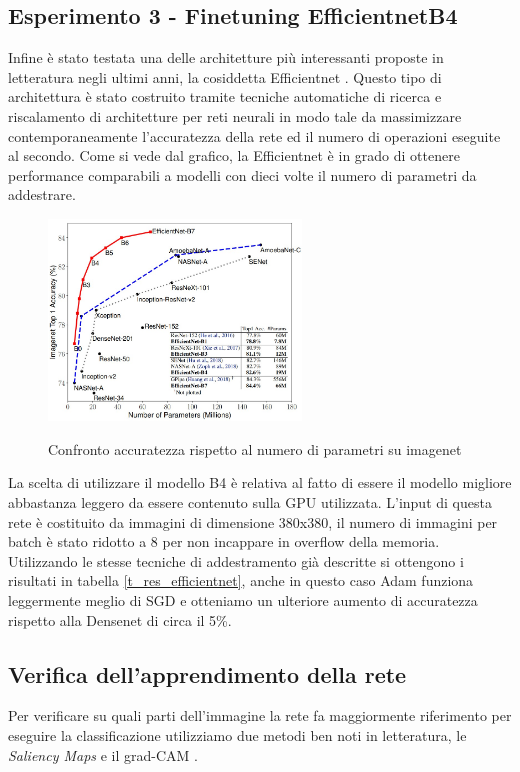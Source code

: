 \subsection{Esperimento 3 - Finetuning EfficientnetB4}
Infine è stato testata una delle architetture più interessanti proposte in letteratura negli ultimi anni, la cosiddetta Efficientnet \cite{tan2019efficientnet}.
Questo tipo di architettura è stato costruito tramite tecniche automatiche di ricerca e riscalamento di architetture per reti neurali in modo tale da massimizzare contemporaneamente l'accuratezza della rete ed il numero di operazioni eseguite al secondo.
Come si vede dal grafico, la Efficientnet è in grado di ottenere performance comparabili a modelli con dieci volte il numero di parametri da addestrare.
\begin{figure}[H]

\centering
\includegraphics[width=0.6\textwidth]{images/efficientnet} 
\label{fig_efficientnet}
\caption{Confronto accuratezza rispetto al numero di parametri su imagenet}
\end{figure} 
La scelta di utilizzare il modello B4 è relativa al fatto di essere il modello migliore abbastanza leggero da essere contenuto sulla GPU utilizzata.
L'input di questa rete è costituito da immagini di dimensione 380x380, il numero di immagini per batch è stato ridotto a 8 per non incappare in overflow della memoria.
Utilizzando le stesse tecniche di addestramento già descritte si ottengono i risultati in tabella \ref{t_res_efficientnet}, anche in questo caso Adam funziona leggermente meglio di SGD e otteniamo un ulteriore aumento di accuratezza rispetto alla Densenet di circa il 5\%.

\subsection{Verifica dell'apprendimento della rete}
Per verificare su quali parti dell'immagine la rete fa maggiormente riferimento per eseguire la classificazione utilizziamo due metodi ben noti in letteratura, le \textit{Saliency Maps} \cite{simonyan2013deep} e il grad-CAM \cite{Selvaraju_2019}.
